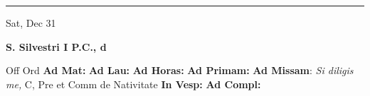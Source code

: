 \documentclass[letterpaper, 10pt]{article}
\begin{document}
\hrule
\begin{center}
Sat, Dec 31
\end{center}\textbf{ \large S. Silvestri I P.C., \textnormal{\normalsize d}}
\begin{justify}
Off Ord
\textbf{Ad Mat: }
\textbf{Ad Lau: }
\textbf{Ad Horas: }
\textbf{Ad Primam: }
\textbf{Ad Missam}: \textit{Si diligis me,} C, Pre et Comm de Nativitate
\textbf{In Vesp: }
\textbf{Ad Compl: }\end{justify}
\end{document}
